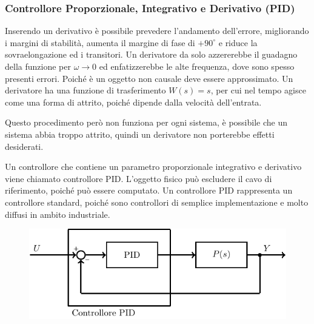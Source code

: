 \documentclass{article}
\numberwithin{equation}{subsection}
\begin{document}
\subsubsection{Controllore Proporzionale, Integrativo e Derivativo (PID)}

Inserendo un derivativo è possibile prevedere l'andamento dell'errore, migliorando i margini di stabilità, aumenta il margine di fase di $+90^{\circ}$ e riduce la 
sovraelongazione ed i transitori. Un derivatore da solo azzererebbe il guadagno della funzione per $\omega\to0$ ed enfatizzerebbe le alte frequenza, dove sono spesso 
presenti errori. Poiché è un oggetto non causale deve essere approssimato. Un derivatore ha una funzione di trasferimento $W(s)=s$, per cui nel tempo agisce come 
una forma di attrito, poiché dipende dalla velocità dell'entrata. 

Questo procedimento 
però non funziona per ogni sistema, è possibile che un sistema abbia troppo attrito, quindi un derivatore non porterebbe effetti desiderati.  



Un controllore che contiene un parametro proporzionale 
integrativo e derivativo viene chiamato controllore PID. L'oggetto fisico può escludere il cavo di riferimento, poiché può essere computato. 
Un controllore PID rappresenta un controllore standard, poiché sono controllori di semplice implementazione e molto diffusi in ambito industriale. 

\begin{figure}[H]%
    \centering
    \includegraphics{pid-1.pdf}%
\end{figure}
\end{document}
